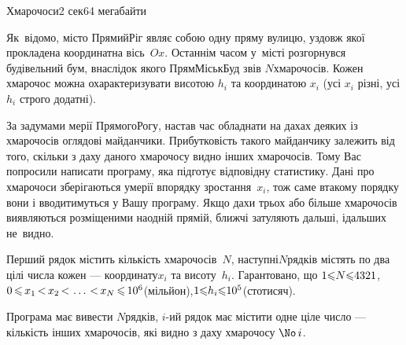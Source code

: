 \documentclass[14pt,a4paper]{extarticle}
\def\dib#1{\,#1\discretionary{}{\mbox{$#1$}}{}\,}
\begin{document}
\vspace{10mm}\par
\begin{problem}{Хмарочоси}{\stdinOrInputTxt}{\stdoutOrOutputTxt}{2 сек}{64 мегабайти}

Як~відомо, місто Прямий\nolinebreak[2] Ріг являє собою одну пряму вулицю, уздовж якої прокладена координатна вісь~$Ox$. Останнім часом у~місті розгорнувся будівельний бум, внаслідок якого ПрямМіськБуд звів $N$\nolinebreak[3] хмарочосів. Кожен хмарочос можна охарактеризувати висотою $h_i$ та координатою $x_i$ (усі $x_i$ різні, усі $h_i$ строго додатні).

За задумами мерії Прямого\nolinebreak[2] Рогу, настав час обладнати на дахах деяких із хмарочосів оглядові майданчики. Прибутковість такого майданчику залежить від того, скільки з даху даного хмарочосу видно інших хмарочосів. Тому Вас попросили написати програму, яка підготує відповідну статистику. Дані про хмарочоси зберігаються у\nolinebreak[3] мерії в\nolinebreak[3] порядку зростання~$x_i$, тож саме в\nolinebreak[3] такому порядку вони і вводитимуться у Вашу програму. Якщо дахи трьох або більше хмарочосів виявляються розміщеними на\nolinebreak[2] одній прямій, ближчі затуляють дальші, і\nolinebreak[3] дальших не~видно.

\InputFile
Перший рядок містить кількість хмарочосів~$N$, наступні\nolinebreak[2] $N$\nolinebreak[3] рядків містять по два цілі числа кожен --- координату\nolinebreak[3] $x_i$ та висоту~$h_i$. Гарантовано, що ${1{\leqslant}N{\leqslant}4321}$, $0\dib{{\<}}x_1\dib{{<}}x_2\dib{{<}}\dots\dib{{<}}x_N\dib{{\<}}10^6$\nolinebreak[3] (мільйон),\linebreak[2] ${1{\leqslant}h_i{\leqslant}10^5}$\nolinebreak[2] (сто\nolinebreak[3] тисяч). 

\OutputFile
Програма має вивести $N$\nolinebreak[3] рядків, $i$-ий рядок має містити одне ціле число --- кількість інших хмарочосів, які видно з даху хмарочосу $\No\,i$.

\begin{minipage}{\textwidth}

\Example

\vspace{-\baselineskip}


\end{minipage}
\end{problem}
\end{document}

